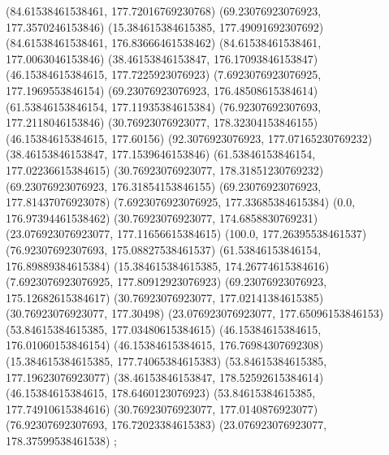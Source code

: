 {{{		(84.61538461538461, 177.72016769230768)
		(69.23076923076923, 177.3570246153846)
		(15.384615384615385, 177.49091692307692)
		(84.61538461538461, 176.83666461538462)
		(84.61538461538461, 177.0063046153846)
		(38.46153846153847, 176.17093846153847)
		(46.15384615384615, 177.7225923076923)
		(7.6923076923076925, 177.1969553846154)
		(69.23076923076923, 176.48508615384614)
		(61.53846153846154, 177.11935384615384)
		(76.92307692307693, 177.2118046153846)
		(30.76923076923077, 178.32304153846155)
		(46.15384615384615, 177.60156)
		(92.3076923076923, 177.07165230769232)
		(38.46153846153847, 177.1539646153846)
		(61.53846153846154, 177.02236615384615)
		(30.76923076923077, 178.31851230769232)
		(69.23076923076923, 176.31854153846155)
		(69.23076923076923, 177.81437076923078)
		(7.6923076923076925, 177.33685384615384)
		(0.0, 176.97394461538462)
		(30.76923076923077, 174.6858830769231)
		(23.076923076923077, 177.11656615384615)
		(100.0, 177.26395538461537)
		(76.92307692307693, 175.08827538461537)
		(61.53846153846154, 176.89889384615384)
		(15.384615384615385, 174.26774615384616)
		(7.6923076923076925, 177.80912923076923)
		(69.23076923076923, 175.12682615384617)
		(30.76923076923077, 177.02141384615385)
		(30.76923076923077, 177.30498)
		(23.076923076923077, 177.65096153846153)
		(53.84615384615385, 177.03480615384615)
		(46.15384615384615, 176.01060153846154)
		(46.15384615384615, 176.76984307692308)
		(15.384615384615385, 177.74065384615383)
		(53.84615384615385, 177.19623076923077)
		(38.46153846153847, 178.52592615384614)
		(46.15384615384615, 178.6460123076923)
		(53.84615384615385, 177.74910615384616)
		(30.76923076923077, 177.0140876923077)
		(76.92307692307693, 176.72023384615383)
		(23.076923076923077, 178.37599538461538)
	};

}}
